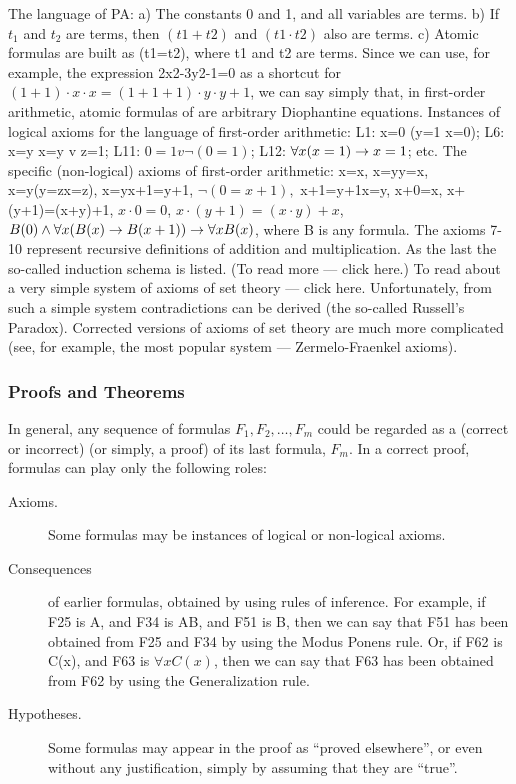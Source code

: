 The language of PA:
a) The constants 0 and 1, and all variables are terms.
b) If \(t_1\) and \(t_2\) are terms, then \((t1+t2)\) and \((t1\cdot t2)\) also are terms.
c) Atomic formulas are built as (t1=t2), where t1 and t2 are terms.
Since we can use, for example, the expression 2x2-3y2-1=0 as a shortcut for \((1+1)\cdot x\cdot x=(1+1+1)\cdot y\cdot y+1\), we can say simply
that, in first-order arithmetic, atomic formulas of are arbitrary Diophantine equations.
Instances of logical axioms for the language of first-order arithmetic:
L1: x=0 \IMPLIES  (y=1 \IMPLIES  x=0);
L6: x=y \IMPLIES  x=y v z=1;
L11: \(0=1 v \neg (0=1)\);
L12: \(\forall x(x=1) \rightarrow  x=1\);
etc.
The specific (non-logical) axioms of first-order arithmetic:
x=x,
x=y\IMPLIES y=x,
x=y\IMPLIES (y=z\IMPLIES x=z),
x=y\IMPLIES x+1=y+1,
\(\neg (0=x+1),\)
x+1=y+1\IMPLIES x=y,
x+0=x,
x+(y+1)=(x+y)+1,
\(x\cdot 0=0\),
\(x\cdot (y+1)=(x\cdot y)+x\),
\(B(0) \wedge  \forall x(B(x)\rightarrow B(x+1))\rightarrow \forall xB(x)\), where B is any formula.
The axioms 7-10 represent recursive definitions of addition and multiplication. As the last the so-called induction schema is
listed. (To read more --- click here.)
To read about a very simple system of axioms of set theory --- click here. Unfortunately, from such a simple system
contradictions can be derived (the so-called Russell's Paradox). Corrected versions of axioms of set theory are much more
complicated (see, for example, the most popular system --- Zermelo-Fraenkel axioms).

\subsubsection{Proofs and Theorems}

In general, any sequence of formulas \(F_1, F_2, \ldots , F_m\) could be regarded as a (correct or incorrect)  (or simply, a proof) of its last formula, \(F_m\).
In a correct proof, formulas can play only the following roles:

\begin{description}
    \item[Axioms.] Some formulas may be instances of logical or non-logical axioms.
    \item[Consequences] of earlier formulas, obtained by using rules of inference. For example, if F25 is A, and F34 is A\IMPLIES B, and F51 is B, then we can say that F51 has been obtained from F25 and F34 by using the Modus Ponens rule. Or, if F62 is C(x), and F63 is \(\forall xC(x)\), then we can say that F63 has been obtained from F62 by using the Generalization rule.
    \item[Hypotheses.] Some formulas may appear in the proof as ``proved elsewhere'', or even without any justification, simply by assuming that they are ``true''.
\end{description}

